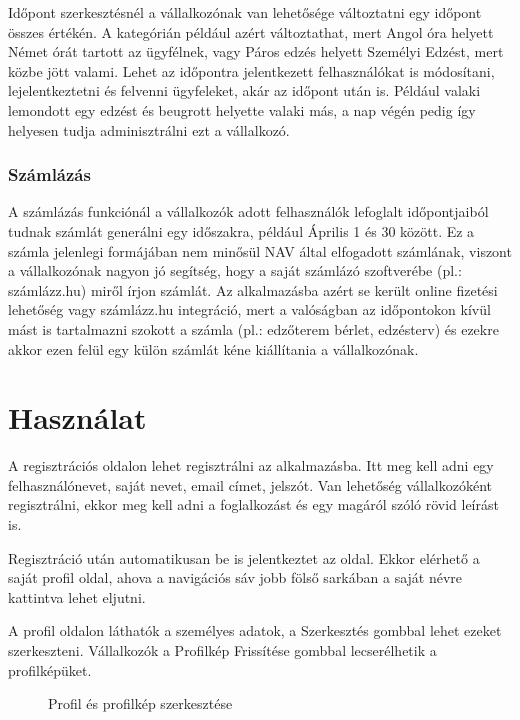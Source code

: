 Időpont szerkesztésnél a vállalkozónak van lehetősége változtatni egy időpont összes értékén. A kategórián például azért változtathat, mert Angol óra helyett Német órát tartott az ügyfélnek, vagy Páros edzés helyett Személyi Edzést, mert közbe jött valami. Lehet az időpontra jelentkezett felhasználókat is módosítani, lejelentkeztetni és felvenni ügyfeleket, akár az időpont után is. Például valaki lemondott egy edzést és beugrott helyette valaki más, a nap végén pedig így helyesen tudja adminisztrálni ezt a vállalkozó.

\subsubsection{Számlázás}

A számlázás funkciónál a vállalkozók adott felhasználók lefoglalt időpontjaiból tudnak számlát generálni egy időszakra, például Április 1 és 30 között. Ez a számla jelenlegi formájában nem minősül NAV által elfogadott számlának, viszont a vállalkozónak nagyon jó segítség, hogy a saját számlázó szoftverébe (pl.: számlázz.hu) miről írjon számlát. Az alkalmazásba azért se került online fizetési lehetőség vagy számlázz.hu integráció, mert a valóságban az időpontokon kívül mást is tartalmazni szokott a számla (pl.: edzőterem bérlet, edzésterv) és ezekre akkor ezen felül egy külön számlát kéne kiállítania a vállalkozónak.

\clearpage

\section{Használat}

A regisztrációs oldalon lehet regisztrálni az alkalmazásba. Itt meg kell adni egy felhasználónevet, saját nevet, email címet, jelszót. Van lehetőség vállalkozóként regisztrálni, ekkor meg kell adni a foglalkozást és egy magáról szóló rövid leírást is.

Regisztráció után automatikusan be is jelentkeztet az oldal. Ekkor elérhető a saját profil oldal, ahova a navigációs sáv jobb fölső sarkában a saját névre kattintva lehet eljutni.

A profil oldalon láthatók a személyes adatok, a Szerkesztés gombbal lehet ezeket szerkeszteni. Vállalkozók a Profilkép Frissítése gombbal lecserélhetik a profilképüket.

\begin{figure}[H]
    \centering
    \caption{Profil és profilkép szerkesztése}
\end{figure}

